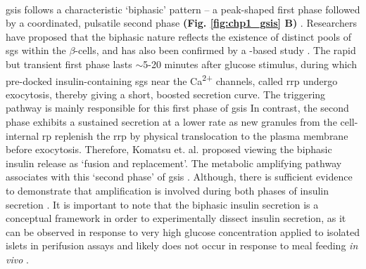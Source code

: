 \\


\par \gls{gsis} follows a characteristic `biphasic' pattern – a peak-shaped first phase followed by a coordinated, pulsatile second phase \textbf{(Fig. \ref{fig:chp1_gsis} B)} \textbf{\cite{ashcroft_diabetes_2012,grodsky_threshold_1972,komatsu_glucosestimulated_2013}}. Researchers have proposed that the biphasic nature reflects the existence of distinct pools of \glspl{sg} within the $\beta$-cells, and has also been confirmed by a -based study \textbf{\cite{ashcroft_diabetes_2012,takahashi_snare_2010}}. The rapid but transient first phase lasts $\sim$5-20 minutes after glucose stimulus, during which pre-docked insulin-containing \glspl{sg} near the Ca\textsuperscript{2+} channels, called \gls{rrp} undergo exocytosis, thereby giving a short, boosted secretion curve. The triggering pathway is mainly responsible for this first phase of \gls{gsis} \textbf{\cite{kalwat_mechanisms_2017,campbell_mechanisms_2021}} %
In contrast, the second phase exhibits a sustained secretion at a lower rate as new granules from the cell-internal \gls{rp} replenish the \gls{rrp} by physical translocation to the plasma membrane before exocytosis. Therefore, Komatsu et. al. \textbf{\cite{komatsu_glucosestimulated_2013}} proposed viewing the biphasic insulin release as `fusion and replacement'. The metabolic amplifying pathway associates with this `second phase' of \gls{gsis} \textbf{\cite{kalwat_mechanisms_2017,campbell_mechanisms_2021}}. Although, there is sufficient evidence to demonstrate that amplification is involved during both phases of insulin secretion \textbf{\cite{mourad_metabolic_2010,mourad_metabolic_2011}}. It is important to note that the biphasic insulin secretion is a conceptual framework in order to experimentally dissect insulin secretion, as it can be observed in response to very high glucose concentration applied to isolated islets in perifusion assays and likely does not occur in response to meal feeding \textit{in vivo} \textbf{\cite{aizawa_rab27a_2005}}.\\

